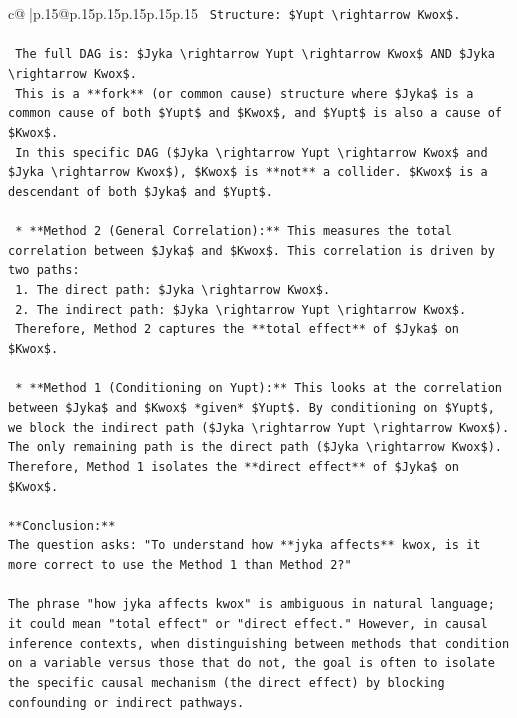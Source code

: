 \documentclass{article}
\begin{document}
{\begin{supertabular}{c@{$\;$}|p{.15\linewidth}@{}p{.15\linewidth}p{.15\linewidth}p{.15\linewidth}p{.15\linewidth}p{.15\linewidth}}
{{{\texttt{    Structure: \$Yupt \textbackslash{}rightarrow Kwox\$.} \\
\\ 
\texttt{    The full DAG is: \$Jyka \textbackslash{}rightarrow Yupt \textbackslash{}rightarrow Kwox\$ AND \$Jyka \textbackslash{}rightarrow Kwox\$.} \\
\texttt{    This is a **fork** (or common cause) structure where \$Jyka\$ is a common cause of both \$Yupt\$ and \$Kwox\$, and \$Yupt\$ is also a cause of \$Kwox\$.} \\
\texttt{    In this specific DAG (\$Jyka \textbackslash{}rightarrow Yupt \textbackslash{}rightarrow Kwox\$ and \$Jyka \textbackslash{}rightarrow Kwox\$), \$Kwox\$ is **not** a collider. \$Kwox\$ is a descendant of both \$Jyka\$ and \$Yupt\$.} \\
\\ 
\texttt{    *   **Method 2 (General Correlation):** This measures the total correlation between \$Jyka\$ and \$Kwox\$. This correlation is driven by two paths:} \\
\texttt{        1.  The direct path: \$Jyka \textbackslash{}rightarrow Kwox\$.} \\
\texttt{        2.  The indirect path: \$Jyka \textbackslash{}rightarrow Yupt \textbackslash{}rightarrow Kwox\$.} \\
\texttt{        Therefore, Method 2 captures the **total effect** of \$Jyka\$ on \$Kwox\$.} \\
\\ 
\texttt{    *   **Method 1 (Conditioning on Yupt):** This looks at the correlation between \$Jyka\$ and \$Kwox\$ *given* \$Yupt\$. By conditioning on \$Yupt\$, we block the indirect path (\$Jyka \textbackslash{}rightarrow Yupt \textbackslash{}rightarrow Kwox\$). The only remaining path is the direct path (\$Jyka \textbackslash{}rightarrow Kwox\$). Therefore, Method 1 isolates the **direct effect** of \$Jyka\$ on \$Kwox\$.} \\
\\ 
\texttt{**Conclusion:**} \\
\texttt{The question asks: "To understand how **jyka affects** kwox, is it more correct to use the Method 1 than Method 2?"} \\
\\ 
\texttt{The phrase "how jyka affects kwox" is ambiguous in natural language; it could mean "total effect" or "direct effect." However, in causal inference contexts, when distinguishing between methods that condition on a variable versus those that do not, the goal is often to isolate the specific causal mechanism (the direct effect) by blocking confounding or indirect pathways.} \\
}}}
\end{supertabular}}
\end{document}
